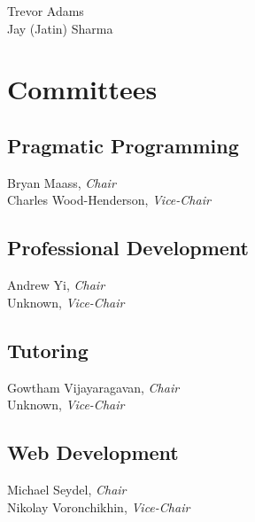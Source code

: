 \documentclass[10pt]{article}
\newcommand{\chair}[1]{#1, \textit{Chair}}
\newcommand{\vicechair}[1]{#1, \textit{Vice-Chair}}
\begin{document}
Trevor Adams\\
Jay (Jatin) Sharma

\section{Committees}

\subsection{Pragmatic Programming}

\chair{Bryan Maass}\\
\vicechair{Charles Wood-Henderson}

\subsection{Professional Development}

\chair{Andrew Yi}\\
\vicechair{Unknown}

\subsection{Tutoring}

\chair{Gowtham Vijayaragavan}\\
\vicechair{Unknown}

\subsection{Web Development}

\chair{Michael Seydel}\\
\vicechair{Nikolay Voronchikhin}
\end{document}
